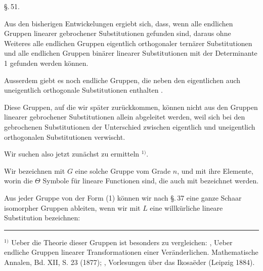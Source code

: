 \begin{center}
\S.\,51.


\end{center}

Aus den bisherigen Entwickelungen ergiebt sich, dass, wenn
alle endlichen Gruppen linearer gebrochener Substitutionen gefunden
 sind, daraus ohne Weiteres alle endlichen Gruppen
eigentlich orthogonaler ternärer Substitutionen und alle endlichen
 Gruppen binärer linearer Substitutionen mit der Determinante
 1 gefunden werden können.

Ausserdem giebt es noch endliche Gruppen, die neben den
eigentlichen auch uneigentlich orthogonale Substitutionen enthalten
.

Diese Gruppen, auf die wir später zurückkommen, können
nicht aus den Gruppen linearer gebrochener Substitutionen allein
abgeleitet werden, weil sich bei den gebrochenen Substitutionen
der Unterschied zwischen eigentlich und uneigentlich orthogonalen
 Substitutionen verwischt.

Wir suchen also jetzt zunächst  zu ermitteln $^{1)}$.

Wir bezeichnen mit $G$ eine solche Gruppe vom Grade $n$,
und mit
ihre Elemente, worin die $\Theta$ Symbole für lineare Functionen
sind, die auch mit
bezeichnet werden.

Aus jeder Gruppe von der Form (1) können wir nach \S.\,37
eine ganze Schaar isomorpher Gruppen ableiten, wenn wir mit
$L$ eine willkürliche lineare Substitution bezeichnen:

\par\noindent\rule{4cm}{0.4pt}\par
$^{1)}$ Ueber die Theorie dieser Gruppen ist besonders zu vergleichen:
, Ueber endliche Gruppen linearer Transformationen einer
Veränderlichen. Mathematische Annalen, Bd. XII, S. 23 (1877);
, Vorlesungen über das Ikosaëder (Leipzig 1884).

